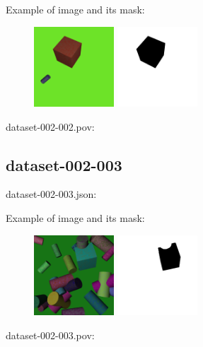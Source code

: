 Example of image and its mask:
\begin{center}
\begin{figure}[H]
\centering\includegraphics[width=3cm]{./img-002-002.png}
\centering\includegraphics[width=3cm]{./mask-002-002.png}
\end{figure}
\end{center}

dataset-002-002.pov:
\begin{scriptsize}
\begin{ttfamily}

\end{ttfamily}
\end{scriptsize}

\subsection{dataset-002-003}

dataset-002-003.json:
\begin{scriptsize}
\begin{ttfamily}

\end{ttfamily}
\end{scriptsize}

Example of image and its mask:
\begin{center}
\begin{figure}[H]
\centering\includegraphics[width=3cm]{./img-002-003.png}
\centering\includegraphics[width=3cm]{./mask-002-003.png}
\end{figure}
\end{center}

dataset-002-003.pov:
\begin{scriptsize}
\begin{ttfamily}

\end{ttfamily}
\end{scriptsize}

